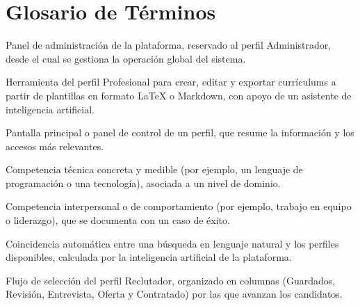 \chapter{Glosario de Términos}
\label{ch:glosario}

\begin{description}[style=unboxed,leftmargin=0pt,itemsep=4pt]
    \item[\textcolor{colorPrimario}{\textbf{Backoffice}}] Panel de administración de la
    plataforma, reservado al perfil Administrador, desde el cual se gestiona la
    operación global del sistema.

    \item[\textcolor{colorPrimario}{\textbf{CV Studio}}] Herramienta del perfil
    Profesional para crear, editar y exportar currículums a partir de plantillas en
    formato LaTeX o Markdown, con apoyo de un asistente de inteligencia artificial.

    \item[\textcolor{colorPrimario}{\textbf{Dashboard}}] Pantalla principal o panel de
    control de un perfil, que resume la información y los accesos más relevantes.

    \item[\textcolor{colorPrimario}{\textbf{Hard Skill (habilidad técnica)}}]
    Competencia técnica concreta y medible (por ejemplo, un lenguaje de programación o
    una tecnología), asociada a un nivel de dominio.

    \item[\textcolor{colorPrimario}{\textbf{Soft Skill (habilidad blanda)}}]
    Competencia interpersonal o de comportamiento (por ejemplo, trabajo en equipo o
    liderazgo), que se documenta con un caso de éxito.

    \item[\textcolor{colorPrimario}{\textbf{Match IA}}] Coincidencia automática entre
    una búsqueda en lenguaje natural y los perfiles disponibles, calculada por la
    inteligencia artificial de la plataforma.

    \item[\textcolor{colorPrimario}{\textbf{Pipeline}}] Flujo de selección del perfil
    Reclutador, organizado en columnas (Guardados, Revisión, Entrevista, Oferta y
    Contratado) por las que avanzan los candidatos.


\end{description}
